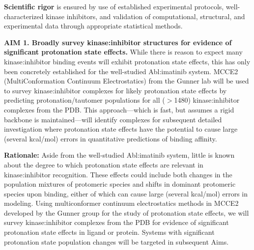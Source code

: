 \documentclass[11pt]{article}
\begin{document}
{\bf Scientific rigor} is ensured by use of established experimental protocols, well-characterized kinase inhibitors, and validation of computational, structural, and experimental data through appropriate statistical methods.

\begin{figure}[b]
\begin{centering}

\end{centering}
\end{figure}

\eject


\begin{mdframed}[middlelinewidth=2pt]
{\bf AIM 1. Broadly survey kinase:inhibitor structures for evidence of significant protonation state effects.} 
While there is reason to expect many kinase:inhibitor binding events will exhibit protonation state effects, this has only been concretely established for the well-studied Abl:imatinib system.  
MCCE2 (MultiConformation Continuum Electrostatics) from the Gunner lab will be used to survey kinase:inhibitor complexes for likely protonation state effects by predicting protonation/tautomer populations for all ($>$1480) kinase:inhibitor complexes from the PDB.
This approach---which is fast, but assumes a rigid backbone is maintained---will identify complexes for subsequent detailed investigation where protonation state effects have the potential to cause large (several kcal/mol) errors in quantitative predictions of binding affinity.
\end{mdframed}

{\bf Rationale:}
Aside from the well-studied Abl:imatinib system, little is known about the degree to which protonation state effects are relevant in kinase:inhibitor recognition.
These effects could include both changes in the population mixtures of protomeric species and shifts in dominant protomeric species upon binding, either of which can cause large (several kcal/mol) errors in modeling.
Using multiconformer continuum electrostatics methods in MCCE2~\cite{gunner:bba:2000:proton-electron-transfer,gunner:j-comput-chem:2009:mcce2} developed by the Gunner group for the study of protonation state effects, we will survey kinase:inhibitor complexes from the PDB for evidence of significant protonation state effects in ligand or protein.
Systems with significant protonation state population changes will be targeted in subsequent Aims.
\end{document}
